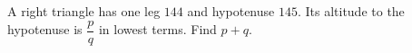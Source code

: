A right triangle has one leg $144$ and hypotenuse $145$. Its altitude to the hypotenuse is $\dfrac{p}{q}$ in lowest terms. Find $p+q$.
